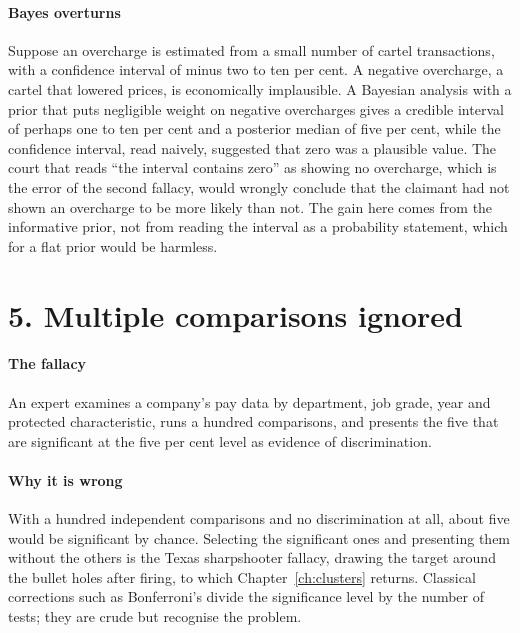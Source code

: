\paragraph{Bayes overturns} Suppose an overcharge is estimated from a small number of cartel transactions, with a confidence interval of minus two to ten per cent. A negative overcharge, a cartel that lowered prices, is economically implausible. A Bayesian analysis with a prior that puts negligible weight on negative overcharges gives a credible interval of perhaps one to ten per cent and a posterior median of five per cent, while the confidence interval, read naively, suggested that zero was a plausible value. The court that reads ``the interval contains zero'' as showing no overcharge, which is the error of the second fallacy, would wrongly conclude that the claimant had not shown an overcharge to be more likely than not. The gain here comes from the informative prior, not from reading the interval as a probability statement, which for a flat prior would be harmless.

\section{5. Multiple comparisons ignored}

\paragraph{The fallacy} An expert examines a company's pay data by department, job grade, year and protected characteristic, runs a hundred comparisons, and presents the five that are significant at the five per cent level as evidence of discrimination.

\paragraph{Why it is wrong} With a hundred independent comparisons and no discrimination at all, about five would be significant by chance. Selecting the significant ones and presenting them without the others is the Texas sharpshooter fallacy, drawing the target around the bullet holes after firing, to which Chapter~\ref{ch:clusters} returns. Classical corrections such as Bonferroni's divide the significance level by the number of tests; they are crude but recognise the problem.

